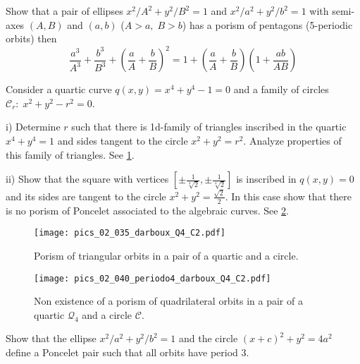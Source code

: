 \begin{exercise}\label{ex:02-01-5periodic-cayley} Show that a pair of   ellipses $x^2/A^2+y^2/B^2=1$ and $x^2/a^2+y^2/b^2=1$ with semi-axes $(A,B)$ and $(a,b)$ ($A>a,\;B>b$) has a porism of pentagons (5-periodic orbits) then
\[\frac{a^3}{A^3}+\frac{b^3}{B^3}+\left(\frac{a}{A}+\frac{b}{B}\right)^2=1+\left(\frac{a}{A}+\frac{b}{B}\right)\left(1+\frac{ab}{AB}\right)\]\end{exercise}

\begin{exercise}\label{ex:02-02-quarticcurve} Consider a quartic curve $q(x,y)=x^4+y^4-1=0$ and a family of circles $\mathcal{C}_r:  \; x^2+y^2-r^2=0$.

\noindent i) Determine $r$ such that there is  1d-family of triangles inscribed in the quartic $x^4+y^4=1$ and sides tangent to the circle $x^2+y^2=r^2$. Analyze   properties of this family of triangles. See   \cref{fig:darbouxq4c2}.

\noindent ii) Show that the square with vertices $[\pm \frac{1}{\sqrt[4]{2}},\pm \frac{1}{\sqrt[4]{2}}]$ is inscribed in $ q(x,y)=0$ and its sides are tangent to the circle $x^2+y^2=\frac{\sqrt{2}}{2}.$ In this case show that there is no porism of Poncelet associated to the algebraic curves. See \cref{fig:period4darboux}.

\begin{figure}[H]
    \centering
    \texttt{[image: pics\_02\_035\_darboux\_Q4\_C2.pdf]}
    \caption{Porism of triangular orbits in a pair of a quartic and a circle.}
    \label{fig:darbouxq4c2}
\end{figure}


\begin{figure}
    \centering
     \texttt{[image: pics\_02\_040\_periodo4\_darboux\_Q4\_C2.pdf]}
    \caption{Non existence of a porism of quadrilateral orbits in a pair of a quartic $\mathcal{Q}_4$ and a circle $\mathcal{C}$.}
    \label{fig:period4darboux}
\end{figure}

\end{exercise}
\begin{exercise}\label{exer:02-03-ponceletpair}
Show that the ellipse $x^2/a^2+y^2/b^2=1$ and the circle $(x+c)^2+y^2=4a^2$ define  a Poncelet pair such that  all  orbits have   period 3.
\end{exercise}

